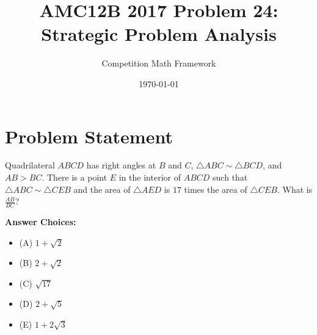 \documentclass[]{article}
\begin{document}
\title{AMC12B 2017 Problem 24: Strategic Problem Analysis}
\author{Competition Math Framework}
\date{\today}
\maketitle

\section*{Problem Statement}

Quadrilateral $ABCD$ has right angles at $B$ and $C$, $\triangle ABC \sim \triangle BCD$, and $AB > BC$. There is a point $E$ in the interior of $ABCD$ such that $\triangle ABC \sim \triangle CEB$ and the area of $\triangle AED$ is $17$ times the area of $\triangle CEB$. What is $\tfrac{AB}{BC}$?

\textbf{Answer Choices:} 
\begin{itemize}[nosep]
    \item (A) $1+\sqrt{2}$ 
    \item (B) $2 + \sqrt{2}$ 
    \item (C) $\sqrt{17}$ 
    \item (D) $2 + \sqrt{5}$ 
    \item (E) $1 + 2\sqrt{3}$
\end{itemize}
\end{document}
